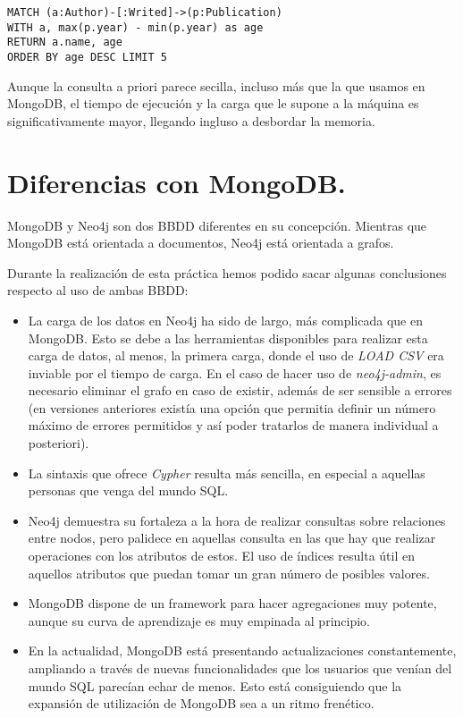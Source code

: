 \begin{verbatim}
MATCH (a:Author)-[:Writed]->(p:Publication)
WITH a, max(p.year) - min(p.year) as age
RETURN a.name, age
ORDER BY age DESC LIMIT 5
\end{verbatim}

Aunque la consulta a priori parece secilla, incluso más que la que usamos en MongoDB, el tiempo de ejecución y la carga que le supone a la máquina es significativamente mayor, llegando ingluso a desbordar la memoria.

\section{Diferencias con MongoDB.}

MongoDB y Neo4j son dos \gls{BBDD} diferentes en su concepción. Mientras que MongoDB está orientada a documentos, Neo4j está orientada a grafos.

Durante la realización de esta práctica hemos podido sacar algunas conclusiones respecto al uso de ambas \gls{BBDD}:

\begin{itemize}
 \item La carga de los datos en Neo4j ha sido de largo, más complicada que en MongoDB. Esto se debe a las herramientas disponibles para realizar esta carga de datos, al menos, la primera carga, donde el uso de \textit{LOAD CSV} era inviable por el tiempo de carga. En el caso de hacer uso de \textit{neo4j-admin}, es necesario eliminar el grafo en caso de existir, además de ser sensible a errores (en versiones anteriores existía una opción que permitia definir un número máximo de errores permitidos y así poder tratarlos de manera individual a posteriori).
 \item La sintaxis que ofrece \textit{Cypher} resulta más sencilla, en especial a aquellas personas que venga del mundo \gls{SQL}.
 \item Neo4j demuestra su fortaleza a la hora de realizar consultas sobre relaciones entre nodos, pero palidece en aquellas consulta en las que hay que realizar operaciones con los atributos de estos. El uso de índices resulta útil en aquellos atributos que puedan tomar un gran número de posibles valores.
 \item MongoDB dispone de un framework para hacer agregaciones muy potente, aunque su curva de aprendizaje es muy empinada al principio.
 \item En la actualidad, MongoDB está presentando actualizaciones constantemente, ampliando a través de nuevas funcionalidades que los usuarios que venían del mundo SQL parecían echar de menos. Esto está consiguiendo que la expansión de utilización de MongoDB sea a un ritmo frenético.
\end{itemize}
